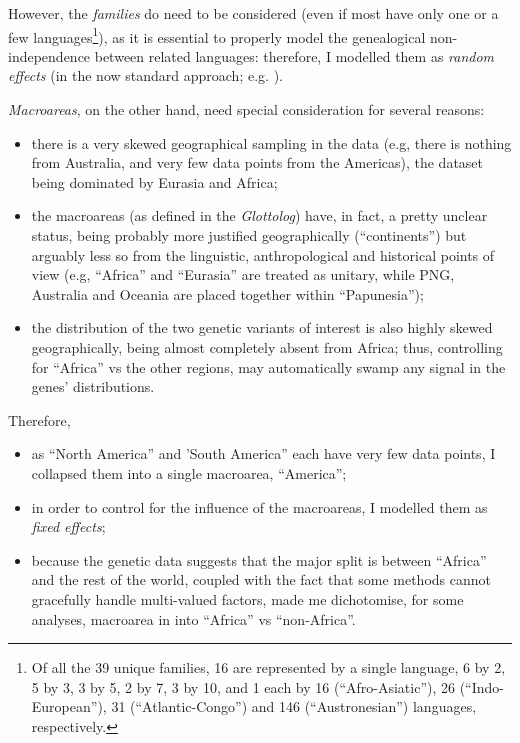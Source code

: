 \documentclass[twoside,twocolumn]{article}
\begin{document}
However, the \emph{families} do need to be considered (even if most have only one or a few languages\footnote{Of all the 39 unique families, 16 are represented by a single language, 6 by 2, 5 by 3, 3 by 5, 2 by 7, 3 by 10, and 1 each by 16 (``Afro-Asiatic''), 26 (``Indo-European''), 31 (``Atlantic-Congo'') and 146 (``Austronesian'') languages, respectively.}), as it is essential to properly model the genealogical non-independence between related languages: therefore, I modelled them as \emph{random effects} (in the now standard approach; e.g. \citealp{ladd_correlational_2015}).

\emph{Macroareas}, on the other hand, need special consideration for several reasons:

\begin{itemize}
  \item there is a very skewed geographical sampling in the data (e.g, there is nothing from Australia, and very few data points from the Americas), the dataset being dominated by Eurasia and Africa;
  \item the macroareas (as defined in the \textit{Glottolog}) have, in fact, a pretty unclear status, being probably more justified geographically (``continents'') but arguably less so from the linguistic, anthropological and historical points of view (e.g, ``Africa'' and ``Eurasia'' are treated as unitary, while PNG, Australia and Oceania are placed together within ``Papunesia'');
  \item the distribution of the two genetic variants of interest is also highly skewed geographically, being almost completely absent from Africa; thus, controlling for ``Africa'' vs the other regions, may automatically swamp any signal in the genes’ distributions.
\end{itemize}

Therefore,

\begin{itemize}
  \item as ``North America'' and 'South America'' each have very few data points, I collapsed them into a single macroarea, ``America'';
  \item in order to control for the influence of the macroareas, I modelled them as \emph{fixed effects};
  \item because the genetic data suggests that the major split is between ``Africa'' and the rest of the world, coupled with the fact that some methods cannot gracefully handle multi-valued factors, made me dichotomise, for some analyses, macroarea in into ``Africa'' vs ``non-Africa''.
\end{itemize}
\end{document}
